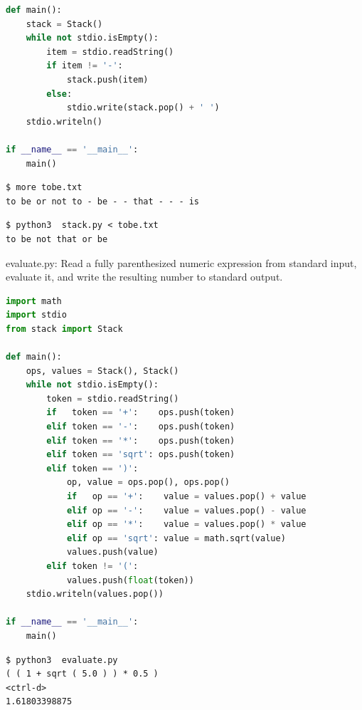 \documentclass[8pt,a4paper,compress]{beamer}
\begin{document}
\begin{frame}[fragile]
\pause

\begin{lstlisting}[language=python,style=focusin]
def main():
    stack = Stack()
    while not stdio.isEmpty():
        item = stdio.readString()
        if item != '-':
            stack.push(item)
        else:
            stdio.write(stack.pop() + ' ')
    stdio.writeln()

if __name__ == '__main__':
    main()
\end{lstlisting}

\pause

\begin{lstlisting}[language={},style=focusin]
$ more tobe.txt
to be or not to - be - - that - - - is
\end{lstlisting}

\pause

\begin{lstlisting}[language={},style=focusin]
$ python3  stack.py < tobe.txt 
to be not that or be
\end{lstlisting}
\end{frame}

\begin{frame}[fragile]
\pause

\begin{framed}
\tiny evaluate.py: Read a fully parenthesized numeric expression from standard input, evaluate it, and write the resulting number to standard output.
\end{framed}

\begin{lstlisting}[language=python,style=focusin]
import math
import stdio
from stack import Stack

def main():
    ops, values = Stack(), Stack()
    while not stdio.isEmpty():
        token = stdio.readString()
        if   token == '+':    ops.push(token)
        elif token == '-':    ops.push(token)
        elif token == '*':    ops.push(token)
        elif token == 'sqrt': ops.push(token)
        elif token == ')':
            op, value = ops.pop(), ops.pop()
            if   op == '+':    value = values.pop() + value
            elif op == '-':    value = values.pop() - value
            elif op == '*':    value = values.pop() * value
            elif op == 'sqrt': value = math.sqrt(value)
            values.push(value)
        elif token != '(':
            values.push(float(token))
    stdio.writeln(values.pop())

if __name__ == '__main__':
    main()
\end{lstlisting}

\pause

\begin{lstlisting}[language={},style=focusin]
$ python3  evaluate.py
( ( 1 + sqrt ( 5.0 ) ) * 0.5 )
<ctrl-d>
1.61803398875
\end{lstlisting}
\end{frame}
\end{document}
